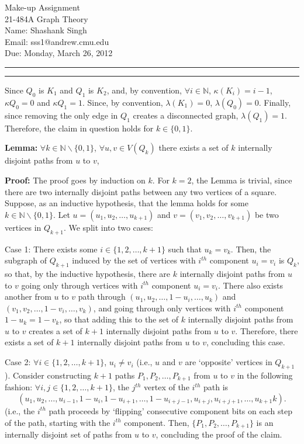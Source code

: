 \documentclass[11pt]{article}
\makeatletter
\newcounter{questionCounter}
\newcounter{partCounter}[questionCounter]
\newenvironment{question}[2][\arabic{questionCounter}]{%
    \setcounter{partCounter}{0}%
    \vspace{.25in} \hrule \vspace{0.5em}%
        \noindent{\bf #2}%
    \vspace{0.8em} \hrule \vspace{.10in}%
    \addtocounter{questionCounter}{1}%
}{}
\newcommand{\myname}{Shashank Singh}
\newcommand{\myandrew}{sss1@andrew.cmu.edu}
\newcommand{\myclass}{21-484A Graph Theory}
\newcommand{\duedate}{Monday, March 26, 2012}
\makeatother
\begin{document}
\thispagestyle{plain}

{\Large Make-up Assignment} \\
\myclass \\
Name: \myname \\
Email: \myandrew \\
Due: \duedate

\begin{question}{Problem 1}
Since $Q_0$ is $K_1$ and $Q_1$ is $K_2$, and, by convention,
$\forall i \in \mathbb{N}$, $\kappa(K_i) = i - 1$, $\kappa Q_0 = 0$ and
$\kappa Q_1 = 1$. Since, by convention, $\lambda(K_1) = 0$,
$\lambda(Q_0) = 0$. Finally, since removing the only edge in $Q_1$ creates a
disconnected graph, $\lambda(Q_1) = 1$. Therefore, the claim in question holds
for $k \in \{0,1\}$.

{\bf Lemma:} $\forall k \in \mathbb{N}\backslash\{0,1\}$,
$\forall u,v \in V(Q_k)$ there exists a set of $k$ internally disjoint paths
from $u$ to $v$, 

{\bf Proof:} The proof goes by induction on $k$. For $k = 2$, the Lemma is
trivial, since there are two internally disjoint paths between any two
vertices of a square. Suppose, as an inductive hypothesis, that the lemma
holds for some $k \in \mathbb{N}\backslash\{0,1\}$. Let
$u = (u_1,u_2,\ldots,u_{k + 1})$ and $v = (v_1,v_2,\ldots,v_{k + 1})$ be two
vertices in $Q_{k + 1}$. We split into two cases:

Case 1: There exists some $i \in \{1,2,\ldots,k + 1\}$ such that $u_k = v_k$.
Then, the subgraph of $Q_{k + 1}$ induced by the set of vertices with $i^{th}$
component $u_i = v_i$ is $Q_k$, so that, by the inductive hypothesis, there
are $k$ internally disjoint paths from $u$ to $v$ going only through vertices
with $i^{th}$ component $u_i = v_i$. There also exists another from $u$ to $v$
path through $(u_1,u_2,\ldots,1 - u_i,\ldots,u_k)$ and
$(v_1,v_2,\ldots,1 - v_i,\ldots,v_k)$, and going through only vertices with
$i^{th}$ component $1 - u_k = 1 - v_k$, so that adding this to the set of $k$
internally disjoint paths from $u$ to $v$ creates a set of $k + 1$ internally
disjoint paths from $u$ to $v$. Therefore, there exists a set of $k + 1$
internally disjoint paths from $u$ to $v$, concluding this case.

Case 2: $\forall i \in \{1,2,\ldots,k + 1\}$, $u_i \neq v_i$ (i.e., $u$ and
$v$ are `opposite' vertices in $Q_{k + 1}$). Consider constructing $k + 1$
paths $P_1,P_2,\ldots,P_{k + 1}$ from $u$ to $v$ in the following fashion:
$\forall i,j \in \{1,2,\ldots,k + 1\}$, the $j^{th}$ vertex of the $i^{th}$
path is
\[(u_1,u_2,\ldots,u_{i - 1},1 - u_i,1 - u_{i + 1},\ldots,1 - u_{i + j - 1},
                                 u_{i + j},u_{i + j + 1},\ldots,u_{k + 1}k).\]
(i.e., the $i^{th}$ path proceeds by `flipping' consecutive component bits on
each step of the path, starting with the $i^{th}$ component. Then,
$\{P_1,P_2,\ldots,P_{k + 1}\}$ is an internally disjoint set of paths from $u$
to $v$, concluding the proof of the claim.


\end{question}
\end{document}
